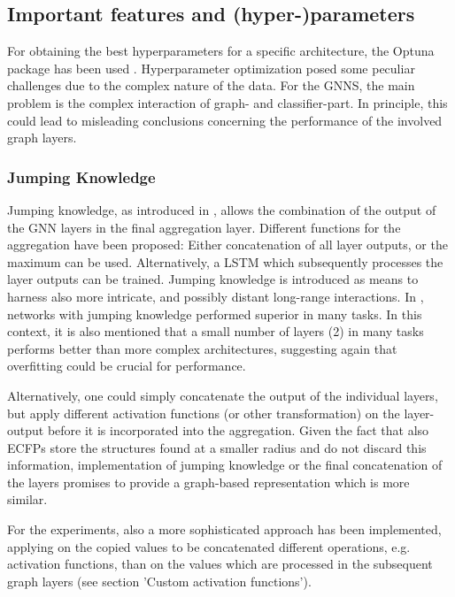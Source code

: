 \subsection{Important features and (hyper-)parameters}

For obtaining the best hyperparameters for a specific architecture, the Optuna package has been used \cite{Akiba.25.07.2019}.
Hyperparameter optimization posed some peculiar challenges due to the complex nature of the data.
For the GNNS, the main problem is the complex interaction of graph- and classifier-part.
In principle, this could lead to misleading conclusions concerning the performance of the involved graph layers.


\subsubsection{Jumping Knowledge}

Jumping knowledge, as introduced in \cite{Xu.01.10.2018}, allows the combination of the output of the GNN layers in the final aggregation layer.
Different functions for the aggregation have been proposed: Either concatenation of all layer outputs, or the maximum can be used. Alternatively, a LSTM which subsequently processes the layer outputs can be trained.
Jumping knowledge is introduced as means to harness also more intricate, and possibly distant long-range interactions.
In \cite{Xu.01.10.2018}, networks with jumping knowledge performed superior in many tasks. In this context, it is also mentioned that a small number of layers (2) in many tasks performs better than more complex architectures, suggesting again that overfitting could be crucial for performance.


Alternatively, one could simply concatenate the output of the individual layers, but apply different activation functions (or other transformation) on the layer-output before it is incorporated into the aggregation.
Given the fact that also ECFPs store the structures found at a smaller radius and do not discard this information, implementation of jumping knowledge or the final concatenation of the layers promises to provide a graph-based representation which is more similar.

For the experiments, also a more sophisticated approach has been implemented, applying on the copied values to be concatenated different operations, e.g. activation functions, than on the values which are processed in the subsequent graph layers (see section 'Custom activation functions').

